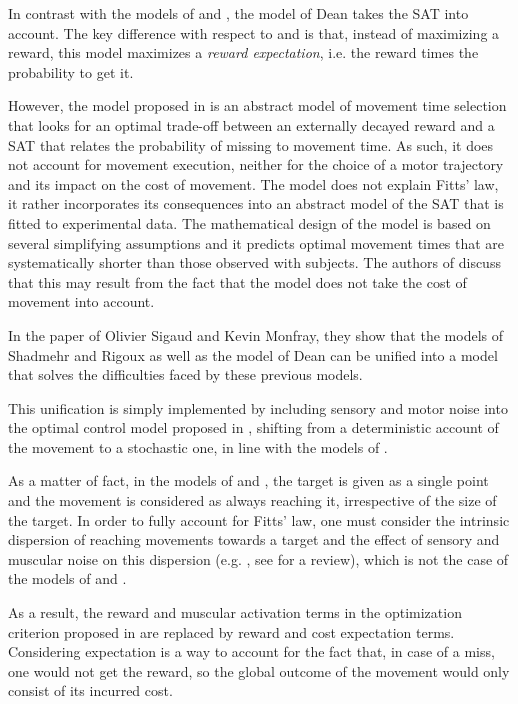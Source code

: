 \documentclass[pdftex,a4paper,11pt]{report}
\begin{document}
In contrast with the models of \cite{shadmehr10} and \cite{rigoux12}, the model of Dean \cite{Dean2007} takes the SAT into account. The key difference with respect to \cite{shadmehr10} and \cite{rigoux12} is that, instead of maximizing a reward, this model maximizes a {\em reward expectation}, i.e. the reward times the probability to get it.

However, the model proposed in \cite{Dean2007} is an abstract model of movement time selection that looks for an optimal trade-off between an externally decayed reward and a SAT that relates the probability of missing to movement time. As such, it does not account for movement execution, neither for the choice of a motor trajectory and its impact on the cost of movement.
The model does not explain Fitts' law, it rather incorporates its consequences into an abstract model of the SAT that is fitted to experimental data.
The mathematical design of the model is based on several simplifying assumptions and it predicts optimal movement times that are systematically shorter than those observed with subjects. The authors of \cite{Dean2007} discuss that this may result from the fact that the model does not take the cost of movement into account.

In the paper of Olivier Sigaud and Kevin Monfray, they show that the models of Shadmehr \cite{shadmehr10} and Rigoux \cite{rigoux12} as well as the model of Dean \cite{Dean2007} can be unified into a model that solves the difficulties faced by these previous models. 

This unification is simply implemented by including sensory and motor noise into the optimal control model proposed in \cite{rigoux12}, shifting from a deterministic account of the movement to a stochastic one, in line with the models of \cite{harris98_N,todorov02_NN,todorov04_NN,todorov05_NC,li2006}.

As a matter of fact, in the models of \cite{shadmehr10} and \cite{rigoux12}, the target is given as a single point and the movement is considered as always reaching it, irrespective of the size of the target. In order to fully account for Fitts' law, one must consider the intrinsic dispersion of reaching movements towards a target and the effect of sensory and muscular noise on this dispersion (e.g. \cite{harris98_N}, see \cite{faisal08} for a review), which is not the case of the models of \cite{shadmehr10} and \cite{rigoux12}. 

As a result, the reward and muscular activation terms in the optimization criterion proposed in \cite{rigoux12} are replaced by reward and cost expectation terms. Considering expectation is a way to account for the fact that, in case of a miss, one would not get the reward, so the global outcome of the movement would only consist of its incurred cost. 
\end{document}
